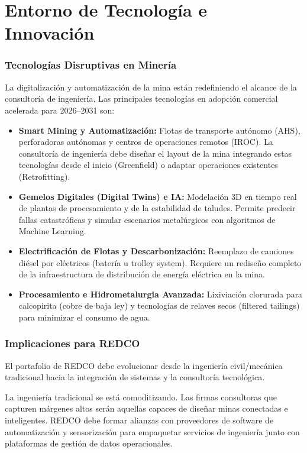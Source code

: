 \chapter{Entorno de Tecnología e Innovación}

\subsection{Tecnologías Disruptivas en Minería}
La digitalización y automatización de la mina están redefiniendo el alcance de la consultoría de ingeniería. Las principales tecnologías en adopción comercial acelerada para 2026--2031 son:

\begin{itemize}
    \item \textbf{Smart Mining y Automatización:} Flotas de transporte autónomo (AHS), perforadoras autónomas y centros de operaciones remotos (IROC). La consultoría de ingeniería debe diseñar el layout de la mina integrando estas tecnologías desde el inicio (Greenfield) o adaptar operaciones existentes (Retrofitting).
    \item \textbf{Gemelos Digitales (Digital Twins) e IA:} Modelación 3D en tiempo real de plantas de procesamiento y de la estabilidad de taludes. Permite predecir fallas catastróficas y simular escenarios metalúrgicos con algoritmos de Machine Learning.
    \item \textbf{Electrificación de Flotas y Descarbonización:} Reemplazo de camiones diésel por eléctricos (batería u trolley system). Requiere un rediseño completo de la infraestructura de distribución de energía eléctrica en la mina.
    \item \textbf{Procesamiento e Hidrometalurgia Avanzada:} Lixiviación clorurada para calcopirita (cobre de baja ley) y tecnologías de relaves secos (filtered tailings) para minimizar el consumo de agua.
\end{itemize}

\subsection{Implicaciones para REDCO}
El portafolio de REDCO debe evolucionar desde la ingeniería civil/mecánica tradicional hacia la integración de sistemas y la consultoría tecnológica.

\begin{keyinsightbox}
La ingeniería tradicional se está comoditizando. Las firmas consultoras que capturen márgenes altos serán aquellas capaces de diseñar minas conectadas e inteligentes. REDCO debe formar alianzas con proveedores de software de automatización y sensorización para empaquetar servicios de ingeniería junto con plataformas de gestión de datos operacionales.
\end{keyinsightbox}
